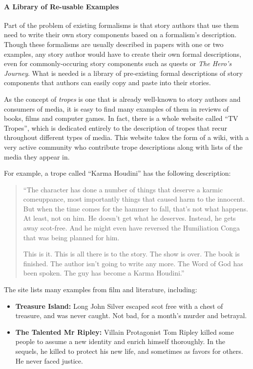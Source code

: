 \documentclass[11pt]{report}
\begin{document}
\paragraph{A Library of Re-usable Examples}
Part of the problem of existing formalisms is that story authors that use them
need to write their own story components based on a formalism's description.
Though these formalisms are usually described in papers with one or two
examples, any story author would have to create their own formal descriptions,
even for commonly-occuring story components such as quests or \emph{The Hero's
  Journey}. What is needed is a library of pre-existing formal descriptions of
story components that authors can easily copy and paste into their stories.

As the concept of \emph{tropes} is one that is already well-known to story
authors and consumers of media, it is easy to find many examples of them in
reviews of books, films and computer games. In fact, there is a whole website
called ``TV Tropes'', which is dedicated entirely to the description of tropes
that recur throughout different types of media. This website takes the form of a
wiki, with a very active community who contribute trope descriptions along with
lists of the media they appear in.

For example, a trope called ``Karma Houdini'' has the following description:

\begin{quote}
``The character has done a number of things that deserve a karmic comeuppance,
most importantly things that caused harm to the innocent.
But when the time comes for the hammer to fall, that's not what happens. At
least, not on him.
He doesn't get what he deserves. Instead, he gets away scot-free.
And he might even have reversed the Humiliation Conga that was being planned for him.

This is it. This is all there is to the story. The show is over. The book is finished. The author isn't going to write any more. The Word of God has been spoken. The guy has become a Karma Houdini.''
\end{quote}

The site lists many examples from film and literature, including:
\begin{itemize}
  \item \textbf{Treasure Island:} Long John Silver escaped scot free with a chest of treasure, and was never caught. Not bad, for a month's murder and betrayal.
  \item \textbf{The Talented Mr Ripley:} Villain Protagonist Tom Ripley killed some people to assume a new identity and enrich himself thoroughly. In the sequels, he killed to protect his new life, and sometimes as favors for others. He never faced justice.
\end{itemize}
\end{document}
